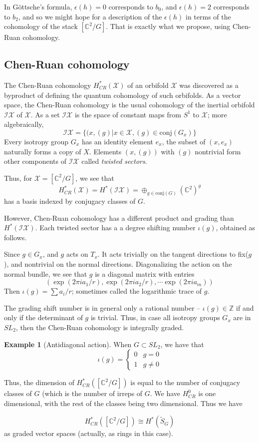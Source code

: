 \documentclass{amsart}[12pt]
\theoremstyle{definition}
\newtheorem{example}[dummy]{Example}
\newcommand{\Z}{\mathbb{Z}}
\newcommand{\C}{\mathbb{C}}
\begin{document}
In G\"ottsche's formula, $\epsilon(h)=0$ corresponds to $b_0$, and $\epsilon(h)=2$ corresponds to $b_2$, and so we might hope for a description of the $\epsilon(h)$ in terms of the cohomology of the stack $[\C^2/G]$.  That is exactly what we propose, using Chen-Ruan cohomology.



\subsection{Chen-Ruan cohomology}

The Chen-Ruan cohomology $H_{CR}^*(\mathcal{X})$ of an orbifold $\mathcal{X}$ was discovered as a byproduct of defining the quantum cohomology of such orbifolds.  As a vector space, the Chen-Ruan cohomology is the usual cohomology of the inertial orbifold $\mathcal{IX}$ of $\mathcal{X}$.  As a set $\mathcal{IX}$ is the space of constant maps from $S^1$ to $\mathcal{X}$; more algebraically, 
$$\mathcal{IX}=\{(x, (g)| x\in \mathcal{X}, (g)\in\textrm{conj}(G_x)\}$$
Every isotropy group $G_x$ has an identity element $e_x$, the subset of $(x, e_x)$ naturally forms a copy of $X$.  Elements $(x,(g))$ with $(g)$ nontrivial form other components of $\mathcal{IX}$ called \emph{twisted sectors}.

Thus, for $\mathcal{X}=[\C^2/G]$, we see that 
$$H_{CR}^*(\mathcal{X}) =H^*(\mathcal{IX})=\oplus_{g\in\textrm{conj}(G)} (\C^2)^g$$
has a basis indexed by conjugacy classes of $G$.

However, Chen-Ruan cohomology has a different product and grading than $H^*(\mathcal{IX})$.  Each twisted sector has a a degree shifting number $\iota(g)$, obtained as follows.

Since $g\in G_x$, and $g$ acts on $T_x$.  It acts trivially on the tangent directions to fix($g$), and nontrivial on the normal directions.  Diagonalizing the action on the normal bundle, we see that $g$ is a diagonal matrix with entries 
$$(\exp(2\pi i a_1/r), \exp(2\pi i a_2/r), \cdots \exp(2\pi i a_m))$$
Then $\iota(g)=\sum a_i/r$; sometimes called the logarithmic trace of $g$.

The grading shift number is in general only a rational number -- $\iota(g)\in \Z$ if and only if the determinant of $g$ is trivial.  Thus, in case all isotropy groups $G_x$ are in $SL_2$, then the Chen-Ruan cohomology is integrally graded.

\begin{example}[Antidiagonal action]
When $G\subset SL_2$, we have that 
$$\iota(g)=\left\{\begin{array}{rl} 0 & g=0 \\
1 & g\neq 0 \end{array}\right.
$$

Thus, the dimension of $H_{CR}^*([\C^2/G])$ is equal to the number of conjugacy classes of $G$ (which is the number of irreps of $G$.  We have $H_{CR}^0$ is one dimensional, with the rest of the classes being two dimensional.  Thus we have

$$H_{CR}^*([\C^2/G])\cong H^*(\widetilde{S}_G)$$
as graded vector spaces (actually, as rings in this case).  
\end{example}
\end{document}
